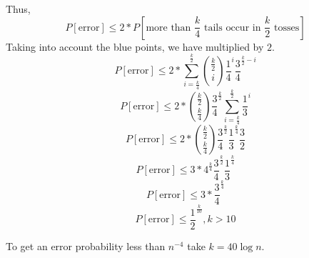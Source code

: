 \documentclass[a4paper]{article}
\begin{document}
Thus,
$$P[\text{error}] \leq 2*P[\text{more than } \frac{k}{4} \text{ tails occur in } \frac{k}{2} \text{ tosses}]$$
Taking into account the blue points, we have multiplied by $2$.
$$P[\text{error}] \leq 2*\sum_{i=\frac{k}{4}}^{\frac{k}{2}}\binom{\frac{k}{2}}{i}\frac{1}{4}^{i}\frac{3}{4}^{\frac{k}{2}-i}$$
$$P[\text{error}] \leq 2*\binom{\frac{k}{2}}{\frac{k}{4}}\frac{3}{4}^{\frac{k}{2}}\sum_{i=\frac{k}{4}}^{\frac{k}{2}}\frac{1}{3}^{i}$$
$$P[\text{error}] \leq 2*\binom{\frac{k}{2}}{\frac{k}{4}}\frac{3}{4}^{\frac{k}{2}}\frac{1}{3}^{\frac{k}{4}}\frac{3}{2}$$
$$P[\text{error}] \leq 3*4^{\frac{k}{4}}\frac{3}{4}^{\frac{k}{2}}\frac{1}{3}^{\frac{k}{4}}$$
$$P[\text{error}] \leq 3*\frac{3}{4}^{\frac{k}{4}}$$
$$P[\text{error}] \leq \frac{1}{2}^{\frac{k}{10}}, k>10$$

To get an error probability less than $n^{-4}$ take $k = 40 \log n$.
\end{document}
